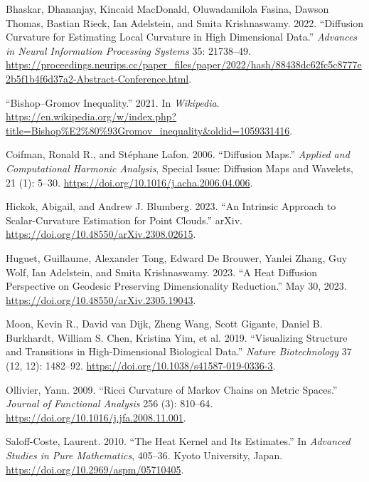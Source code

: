 \documentclass[
  letterpaper,
  DIV=11,
  numbers=noendperiod]{scrartcl}
\newlength{\cslhangindent}
\newenvironment{CSLReferences}[2] %
 {\begin{list}{}{%
  \setlength{\itemindent}{0pt}
  \setlength{\leftmargin}{0pt}
  \setlength{\parsep}{0pt}
  \ifodd #1
   \setlength{\leftmargin}{\cslhangindent}
   \setlength{\itemindent}{-1\cslhangindent}
  \fi
  \setlength{\itemsep}{#2\baselineskip}}}
 {\end{list}}
\theoremstyle{plain}
\theoremstyle{definition}
\theoremstyle{plain}
\theoremstyle{definition}
\theoremstyle{plain}
\theoremstyle{remark}
\begin{document}
\label{refs}
\begin{CSLReferences}{1}{0}
Bhaskar, Dhananjay, Kincaid MacDonald, Oluwadamilola Fasina, Dawson
Thomas, Bastian Rieck, Ian Adelstein, and Smita Krishnaswamy. 2022.
{``Diffusion Curvature for Estimating Local Curvature in High
Dimensional Data.''} \emph{Advances in Neural Information Processing
Systems} 35: 21738--49.
\url{https://proceedings.neurips.cc/paper_files/paper/2022/hash/88438dc62fc5c8777e2b5f1b4f6d37a2-Abstract-Conference.html}.

{``Bishop--{Gromov} Inequality.''} 2021. In \emph{Wikipedia}.
\url{https://en.wikipedia.org/w/index.php?title=Bishop\%E2\%80\%93Gromov_inequality&oldid=1059331416}.

Coifman, Ronald R., and Stéphane Lafon. 2006. {``Diffusion Maps.''}
\emph{Applied and Computational Harmonic Analysis}, Special {Issue}:
{Diffusion Maps} and {Wavelets}, 21 (1): 5--30.
\url{https://doi.org/10.1016/j.acha.2006.04.006}.

Hickok, Abigail, and Andrew J. Blumberg. 2023. {``An {Intrinsic
Approach} to {Scalar-Curvature Estimation} for {Point Clouds}.''} arXiv.
\url{https://doi.org/10.48550/arXiv.2308.02615}.

Huguet, Guillaume, Alexander Tong, Edward De Brouwer, Yanlei Zhang, Guy
Wolf, Ian Adelstein, and Smita Krishnaswamy. 2023. {``A {Heat Diffusion
Perspective} on {Geodesic Preserving Dimensionality Reduction}.''} May
30, 2023. \url{https://doi.org/10.48550/arXiv.2305.19043}.

Moon, Kevin R., David van Dijk, Zheng Wang, Scott Gigante, Daniel B.
Burkhardt, William S. Chen, Kristina Yim, et al. 2019. {``Visualizing
Structure and Transitions in High-Dimensional Biological Data.''}
\emph{Nature Biotechnology} 37 (12, 12): 1482--92.
\url{https://doi.org/10.1038/s41587-019-0336-3}.

Ollivier, Yann. 2009. {``Ricci Curvature of {Markov} Chains on Metric
Spaces.''} \emph{Journal of Functional Analysis} 256 (3): 810--64.
\url{https://doi.org/10.1016/j.jfa.2008.11.001}.

Saloff-Coste, Laurent. 2010. {``The Heat Kernel and Its Estimates.''} In
\emph{Advanced {Studies} in {Pure Mathematics}}, 405--36. Kyoto
University, Japan. \url{https://doi.org/10.2969/aspm/05710405}.


\end{CSLReferences}
\end{document}
